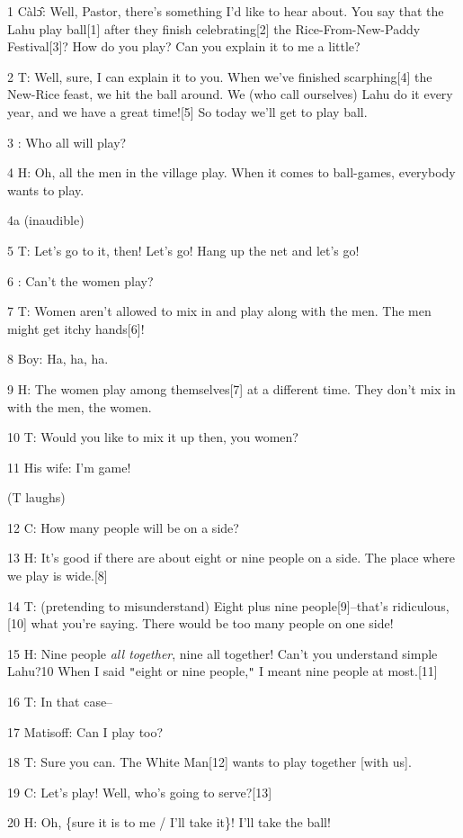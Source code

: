1 Càlɔ̂: Well, Pastor, there's something I'd like to hear about. You say that
the Lahu play ball[1] after they finish celebrating[2] the Rice-From-New-Paddy
Festival[3]? How do you play? Can you explain it to me a little?

2 T: Well, sure, I can explain it to you. When we've finished scarphing[4] the
New-Rice feast, we hit the ball around. We (who call ourselves) Lahu do it every
year, and we have a great time![5] So today we'll get to play ball.

3   : Who all will play?

4 H: Oh, all the men in the village play. When it comes to ball-games, everybody
wants to play.

4a (inaudible)

5 T: Let's go to it, then! Let's go! Hang up the net and let's go!

6   : Can't the women play?

7 T: Women aren't allowed to mix in and play along with the men. The men might
get itchy hands[6]!

8 Boy: Ha, ha, ha.

9 H: The women play among themselves[7] at a different time. They don't mix in
with the men, the women.

10 T: Would you like to mix it up then, you women?

11 His wife: I'm game!

(T laughs)

12 C: How many people will be on a side?

13 H: It's good if there are about eight or nine people on a side. The place where
we play is wide.[8]

14 T: (pretending to misunderstand) Eight plus nine people[9]--that's ridiculous,[10]
what you're saying. There would be too many people on one side!

15 H: Nine people \textit{all together}, nine all together! Can't you understand
simple Lahu?10 When I said \texttt{"}eight or nine people,\texttt{"} I meant nine
people at most.[11]

16 T: In that case--

17 Matisoff: Can I play too?

18 T: Sure you can. The White Man[12] wants to play together [with us].

19 C: Let's play! Well, who's going to serve?[13]

20 H: Oh, \{sure it is to me / I'll take it\}! I'll take the ball!

